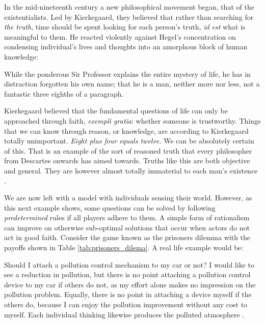 In the mid-nineteenth century a new philosophical movement began, that of the existentialists. Led by Kierkegaard, they believed that rather than searching for \textit{the truth}, time should be spent looking for each person's truth, \textit{id est} what is meaningful to them. He reacted violently against Hegel's concentration on condensing individual's lives and thoughts into an amorphous block of human knowledge:

\begin{displayquote}
While the ponderous Sir Professor explains the entire mystery of life, he has in distraction forgotten his own name; that he is a man, neither more nor less, not a fantastic three eighths of a paragraph.
\end{displayquote}

Kierkegaard believed that the fundamental questions of life can only be approached through faith, \textit{exempli gratia}: whether someone is trustworthy. Things that we can know through reason, or knowledge, are according to Kierkegaard totally unimportant. \textit{Eight plus four equals twelve.} We can be absolutely certain of this. That is an example of the sort of reasoned truth that every philosopher from Descartes onwards has aimed towards. Truths like this are both objective and general. They are however almost totally immaterial to each man's existence \citep{Kierkegaard:1844}.



We are now left with a model with individuals sensing their world. However, as this next example shows, some questions can be solved by following \textit{predetermined} rules if all players adhere to them. A simple form of rationalism can improve on otherwise sub-optimal solutions that occur when actors do not act in good faith. Consider the game known as the prisoners dilemma with the payoffs shown in Table \ref{tab:prisoners_dilema}. A real life example would be:

\begin{displayquote}
Should I attach a pollution control mechanism to my car or not? I would like to see a reduction in pollution, but there is no point attaching a pollution control device to my car if others do not, as my effort alone makes no impression on the pollution problem. Equally, there is no point in attaching a device myself if the others do, because I can enjoy the pollution improvement without any cost to myself. Each individual thinking likewise produces the polluted atmosphere \citep{Hargreaves:1989}.
\end{displayquote}

